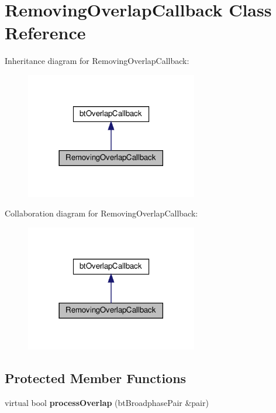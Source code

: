 \hypertarget{classRemovingOverlapCallback}{}\section{Removing\+Overlap\+Callback Class Reference}
\label{classRemovingOverlapCallback}


Inheritance diagram for Removing\+Overlap\+Callback\+:
\nopagebreak
\begin{figure}[H]
\begin{center}
\leavevmode
\includegraphics[width=213pt]{classRemovingOverlapCallback__inherit__graph}
\end{center}
\end{figure}


Collaboration diagram for Removing\+Overlap\+Callback\+:
\nopagebreak
\begin{figure}[H]
\begin{center}
\leavevmode
\includegraphics[width=213pt]{classRemovingOverlapCallback__coll__graph}
\end{center}
\end{figure}
\subsection*{Protected Member Functions}
\begin{DoxyCompactItemize}
\item 
\mbox{\label{classRemovingOverlapCallback_aca04ec1cf011025cdf948610f5f95239}} 
virtual bool {\bfseries process\+Overlap} (bt\+Broadphase\+Pair \&pair)
\end{DoxyCompactItemize}
